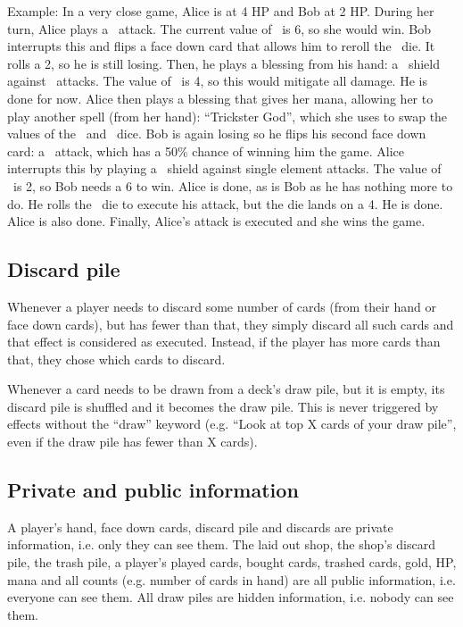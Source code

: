 \documentclass[dvipsnames,parskip,a4paper]{scrartcl}
\newcommand{\iconsize}{3.4mm}
\newcommand{\icondepth}{0.45mm}
\newcommand{\icon}[1]{\raisebox{-\icondepth}{\texttt{[image:  \#1 ]}}}
\newcommand{\chance}{\icon{icons/chance.png}}
\newcommand{\fire}{\icon{icons/fire.png}}
\newcommand{\water}{\icon{icons/water.png}}
\newcommand{\gold}{\icon{icons/gold.png}}
\begin{document}
Example: In a very close game, Alice is at 4 HP and Bob at 2 HP. During her turn, Alice plays a \fire \ attack. The current value of \fire \ is 6, so she would win. Bob interrupts this and flips a face down card that allows him to reroll the \fire \ die. It rolls a 2, so he is still losing. Then, he plays a blessing from his hand: a \water \ shield against \fire \ attacks. The value of \water \ is 4, so this would mitigate all damage. He is done for now. Alice then plays a blessing that gives her mana, allowing her to play another spell (from her hand): ``Trickster God'', which she uses to swap the values of the \fire \ and \water \ dice. Bob is again losing so he flips his second face down card: a \chance \ attack, which has a 50\% chance of winning him the game. Alice interrupts this by playing a \gold \ shield against single element attacks. The value of \gold \ is 2, so Bob needs a 6 to win. Alice is done, as is Bob as he has nothing more to do. He rolls the \chace \ die to execute his attack, but the die lands on a 4. He is done. Alice is also done. Finally, Alice's attack is executed and she wins the game.

\subsection*{Discard pile}

Whenever a player needs to discard some number of cards (from their hand or face down cards), but has fewer than that, they simply discard all such cards and that effect is considered as executed. Instead, if the player has more cards than that, they chose which cards to discard.

\vspace*{4pt}

Whenever a card needs to be drawn from a deck's draw pile, but it is empty, its discard pile is shuffled and it becomes the draw pile. This is never triggered by effects without the ``draw'' keyword (e.g. ``Look at top X cards of your draw pile'', even if the draw pile has fewer than X cards).

\subsection*{Private and public information}

A player's hand, face down cards, discard pile and discards are private information, i.e. only they can see them. The laid out shop, the shop's discard pile, the trash pile, a player's played cards, bought cards, trashed cards, gold, HP, mana and all counts (e.g. number of cards in hand) are all public information, i.e. everyone can see them. All draw piles are hidden information, i.e. nobody can see them.
\end{document}
